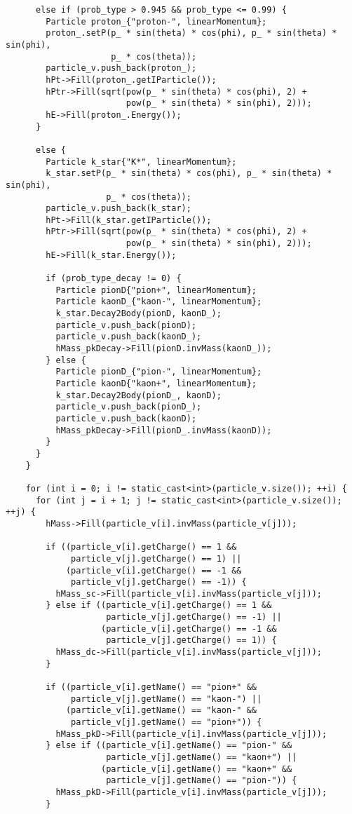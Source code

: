 \begin{lstlisting}
      else if (prob_type > 0.945 && prob_type <= 0.99) {
        Particle proton_{"proton-", linearMomentum};
        proton_.setP(p_ * sin(theta) * cos(phi), p_ * sin(theta) * sin(phi),
                     p_ * cos(theta));
        particle_v.push_back(proton_);
        hPt->Fill(proton_.getIParticle());
        hPtr->Fill(sqrt(pow(p_ * sin(theta) * cos(phi), 2) +
                        pow(p_ * sin(theta) * sin(phi), 2)));
        hE->Fill(proton_.Energy());
      }

      else {
        Particle k_star{"K*", linearMomentum};
        k_star.setP(p_ * sin(theta) * cos(phi), p_ * sin(theta) * sin(phi),
                    p_ * cos(theta));
        particle_v.push_back(k_star);
        hPt->Fill(k_star.getIParticle());
        hPtr->Fill(sqrt(pow(p_ * sin(theta) * cos(phi), 2) +
                        pow(p_ * sin(theta) * sin(phi), 2)));
        hE->Fill(k_star.Energy());

        if (prob_type_decay != 0) {
          Particle pionD{"pion+", linearMomentum};
          Particle kaonD_{"kaon-", linearMomentum};
          k_star.Decay2Body(pionD, kaonD_);
          particle_v.push_back(pionD);
          particle_v.push_back(kaonD_);
          hMass_pkDecay->Fill(pionD.invMass(kaonD_));
        } else {
          Particle pionD_{"pion-", linearMomentum};
          Particle kaonD{"kaon+", linearMomentum};
          k_star.Decay2Body(pionD_, kaonD);
          particle_v.push_back(pionD_);
          particle_v.push_back(kaonD);
          hMass_pkDecay->Fill(pionD_.invMass(kaonD));
        }
      }
    }

    for (int i = 0; i != static_cast<int>(particle_v.size()); ++i) {
      for (int j = i + 1; j != static_cast<int>(particle_v.size()); ++j) {
        hMass->Fill(particle_v[i].invMass(particle_v[j]));

        if ((particle_v[i].getCharge() == 1 &&
             particle_v[j].getCharge() == 1) ||
            (particle_v[i].getCharge() == -1 &&
             particle_v[j].getCharge() == -1)) {
          hMass_sc->Fill(particle_v[i].invMass(particle_v[j]));
        } else if ((particle_v[i].getCharge() == 1 &&
                    particle_v[j].getCharge() == -1) ||
                   (particle_v[i].getCharge() == -1 &&
                    particle_v[j].getCharge() == 1)) {
          hMass_dc->Fill(particle_v[i].invMass(particle_v[j]));
        }

        if ((particle_v[i].getName() == "pion+" &&
             particle_v[j].getName() == "kaon-") ||
            (particle_v[i].getName() == "kaon-" &&
             particle_v[j].getName() == "pion+")) {
          hMass_pkD->Fill(particle_v[i].invMass(particle_v[j]));
        } else if ((particle_v[i].getName() == "pion-" &&
                    particle_v[j].getName() == "kaon+") ||
                   (particle_v[i].getName() == "kaon+" &&
                    particle_v[j].getName() == "pion-")) {
          hMass_pkD->Fill(particle_v[i].invMass(particle_v[j]));
        }


\end{lstlisting}
